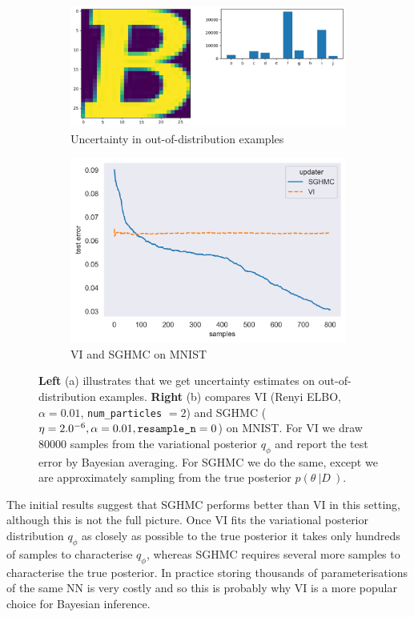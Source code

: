 \begin{figure}[h!]
\centering
\begin{subfigure}{.5\textwidth}
  \centering
  \includegraphics[width=.95\linewidth]{parts/Images/B.png}
  \caption{Uncertainty in out-of-distribution examples}
  \label{fig:B}
\end{subfigure}%
\begin{subfigure}{.5\textwidth}
  \centering
  \includegraphics[width=.95\linewidth]{parts/Images/VI_SGHMC.png}
  \caption{VI and SGHMC on MNIST}
  \label{fig:VI}
\end{subfigure}
\caption{{\bf Left} (a) illustrates that we get uncertainty estimates on out-of-distribution examples. {\bf Right} (b) compares VI (Renyi ELBO, $\alpha = 0.01$, \texttt{num\_particles} $= 2$) and SGHMC ($\eta = 2.0\time10^{-6}, \alpha=0.01, \texttt{resample\_n} =0$) on MNIST. For VI we draw 80000 samples from the variational posterior $q_{\phi}$ and report the test error by Bayesian averaging. For SGHMC we do the same, except we are approximately sampling from the true posterior $p(\theta \: | D \:)$.}
\label{fig:demo}
\end{figure}
The initial results suggest that SGHMC performs better than VI in this setting, although this is not the full picture. Once VI fits the variational posterior distribution $q_{\phi}$ as closely as possible to the true posterior it takes only hundreds of samples to characterise $q_{\phi}$, whereas SGHMC requires several more samples to characterise the true posterior. In practice storing thousands of parameterisations of the same NN is very costly and so this is probably why VI is a more popular choice for Bayesian inference. 

